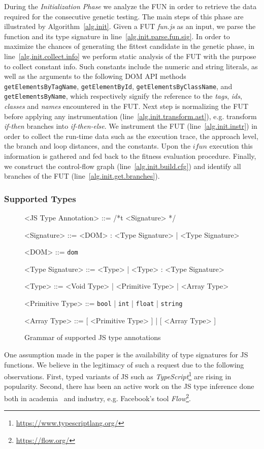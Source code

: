 \documentclass[sigconf,review,anonymous]{acmart}
\begin{document}
During the \emph{Initialization Phase} we analyze the FUN in order to retrieve the data required for the consecutive genetic testing. The main steps of this phase are illustrated by Algorithm~\ref{alg.init}. Given a FUT \emph{fun.js} as an input, we parse the function and its type signature in line~\ref{alg.init.parse.fun.sig}. In order to maximize the chances of generating the fittest candidate in the genetic phase, in line~\ref{alg.init.collect.info} we perform static analysis of the FUT with the purpose to collect constant info. Such constants include the numeric and string literals, as well as the arguments to the following DOM API methods \texttt{getElementsByTagName}, \texttt{getElementById}, \texttt{getElementsByClassName}, and \texttt{getElementsByName},
which respectively signify the reference to the \emph{tags}, \emph{ids}, \emph{classes} and \emph{names} encountered in the FUT. Next step is normalizing the FUT before applying any instrumentation (line~\ref{alg.init.transform.ast}), e.g. transform \emph{if-then} branches into \emph{if-then-else}. We instrument the FUT (line~\ref{alg.init.instr}) in order to collect the run-time data such as the execution trace, the approach level, the branch and loop distances, and the constants. Upon the $ifun$ execution this information is gathered and fed back to the fitness evaluation procedure. Finally, we construct the control-flow graph (line~\ref{alg.init.build.cfg}) and identify all branches of the FUT (line~\ref{alg.init.get.branches}).

\subsubsection{Supported Types}
\label{sub.sec.sup.types}

\begin{figure}[t!]
\setlength{\grammarparsep}{3pt}
\small
\begin{grammar}

<JS Type Annotation> ::= /*t <Signature> */

<Signature> ::= <DOM> : <Type Signature> | <Type Signature>

<DOM> ::= \texttt{dom}

<Type Signature> ::= <Type> | <Type> : <Type Signature>

<Type> ::= <Void Type> | <Primitive Type> | <Array Type>

<Primitive Type> ::= \texttt{bool} | \texttt{int} | \texttt{float} | \texttt{string}

<Array Type> ::= [ <Primitive Type> ] | [ <Array Type> ]
\end{grammar}
\caption{Grammar of supported JS type annotations}
\label{fig.js.type.annot}
\end{figure}
One assumption made in the paper is the availability of type signatures for JS functions. We believe in the legitimacy of such a request due to the following observations. First, typed variants of JS such as \emph{TypeScript}\footnote{\url{https://www.typescriptlang.org/}} are rising in popularity. Second, there has been an active work on the JS type inference done both in academia~\cite{paper} and industry, e.g. Facebook's tool \emph{Flow}\footnote{\url{https://flow.org/}}. 
\end{document}
